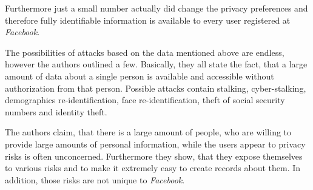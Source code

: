 Furthermore just a small number actually did change the privacy preferences and
therefore fully identifiable information is available to every user registered
at \textit{Facebook}.

The possibilities of attacks based on the data mentioned above are endless,
however the authors outlined a few. Basically, they all state the fact, that
a large amount of data about a single person is available and accessible
without authorization from that person. Possible attacks contain stalking,
cyber-stalking, demographics re-identification, face re-identification, theft of
social security numbers and identity theft.

The authors claim, that there is a large amount of people, who are willing to
provide large amounts of personal information, while the users appear to
privacy risks is often unconcerned. Furthermore they show, that they expose
themselves to various risks and to make it extremely easy to create records
about them. In addition, those risks are not unique to \textit{Facebook}.
